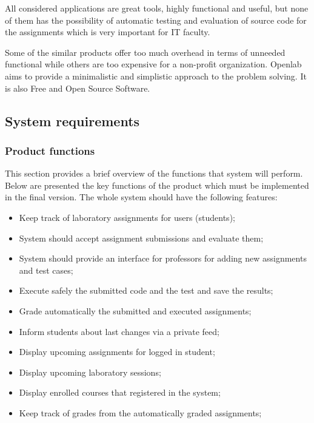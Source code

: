\documentclass[12pt,oneside,a4paper]{article}
\begin{document}
All considered applications are great tools, highly functional and useful, but none of them has the possibility of automatic testing and evaluation of source code for the assignments which is very important for IT faculty. 

Some of the similar products offer too much overhead in terms of unneeded functional while others are too expensive for a non-profit organization. Openlab aims to provide a minimalistic and simplistic approach to the problem solving. It is also Free and Open Source Software.

\subsection{System requirements}
\subsubsection{Product functions}
This section provides a brief overview of the functions that system will perform. Below are presented the key functions of the product which must be implemented in the final version. The whole system should have the following features:
\begin{itemize}
  \item Keep track of laboratory assignments for users (students);
  \item System should accept assignment submissions and evaluate them;
  \item System should provide an interface for professors for adding new assignments and test cases;
  \item Execute safely the submitted code and the test and save the results;
  \item Grade automatically the submitted and executed assignments;
  \item Inform students about last changes via a private feed;
  \item Display upcoming assignments for logged in student;
  \item Display upcoming laboratory sessions;
  \item Display enrolled courses that registered in the system;
  \item Keep track of grades from the automatically graded assignments;
\end{itemize}
\end{document}
